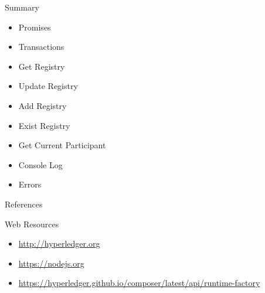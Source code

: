 \documentclass[pdf,table]{beamer}
\begin{document}
\begin{frame}{Summary}
	\begin{itemize}
		\item Promises
		\item Transactions
		\item Get Registry
		\item Update Registry
		\item Add Registry
		\item Exist Registry
		\item Get Current Participant
		\item Console Log
		\item Errors
	\end{itemize}
\end{frame}


\begin{frame}[allowframebreaks]{References}
	\nocite{hyperledger:1,hyperledger:2}
	\printbibliography
\end{frame}
	
\begin{frame}{Web Resources}
	\begin{itemize}
	\item \url{http://hyperledger.org}
	\item \url{https://nodejs.org}
	\item \url{https://hyperledger.github.io/composer/latest/api/runtime-factory}

	\end{itemize}
\end{frame}
\end{document}
